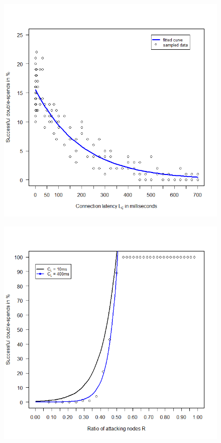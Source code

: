 \documentclass[a4paper,12pt,twoside]{report}
\begin{document}
\begin{figure}
\centering
\begin{minipage}{.5\textwidth}
  \centering
  \includegraphics[width=\linewidth]{Experiments/ConnLatency/connection.png}
  \label{fig:test1}
\end{minipage}%
\begin{minipage}{.5\textwidth}
  \centering
  \includegraphics[width=\linewidth]{Experiments/ConnLatency/conrat.png}
  \label{fig:test2}
\end{minipage}
\end{figure}
\end{document}
